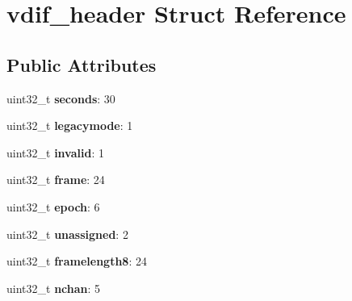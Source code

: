 \hypertarget{structvdif__header}{}\section{vdif\+\_\+header Struct Reference}
\label{structvdif__header}
\subsection*{Public Attributes}
\begin{DoxyCompactItemize}
\item 
\hypertarget{structvdif__header_a68bbf777e91263c7a50b6a01f897ec7a}{}uint32\+\_\+t {\bfseries seconds}\+: 30\label{structvdif__header_a68bbf777e91263c7a50b6a01f897ec7a}

\item 
\hypertarget{structvdif__header_aae423e5d8ef5e68e6827503acdfab7cf}{}uint32\+\_\+t {\bfseries legacymode}\+: 1\label{structvdif__header_aae423e5d8ef5e68e6827503acdfab7cf}

\item 
\hypertarget{structvdif__header_aa4984900f8664b875cfeac202cf7d3ab}{}uint32\+\_\+t {\bfseries invalid}\+: 1\label{structvdif__header_aa4984900f8664b875cfeac202cf7d3ab}

\item 
\hypertarget{structvdif__header_ab12e4d4bf3a53c08a9ce7ec2f5a0d42b}{}uint32\+\_\+t {\bfseries frame}\+: 24\label{structvdif__header_ab12e4d4bf3a53c08a9ce7ec2f5a0d42b}

\item 
\hypertarget{structvdif__header_af12e1abee59ffff37be57ece39aa6d23}{}uint32\+\_\+t {\bfseries epoch}\+: 6\label{structvdif__header_af12e1abee59ffff37be57ece39aa6d23}

\item 
\hypertarget{structvdif__header_a4e86ed9f93597187f57783c75ec3ba1e}{}uint32\+\_\+t {\bfseries unassigned}\+: 2\label{structvdif__header_a4e86ed9f93597187f57783c75ec3ba1e}

\item 
\hypertarget{structvdif__header_a11e3a8a162e01a1983b94eb3a6638bb9}{}uint32\+\_\+t {\bfseries framelength8}\+: 24\label{structvdif__header_a11e3a8a162e01a1983b94eb3a6638bb9}

\item 
\hypertarget{structvdif__header_a387d80cfdf349e3471811696ce3abb15}{}uint32\+\_\+t {\bfseries nchan}\+: 5\label{structvdif__header_a387d80cfdf349e3471811696ce3abb15}


\end{DoxyCompactItemize}
